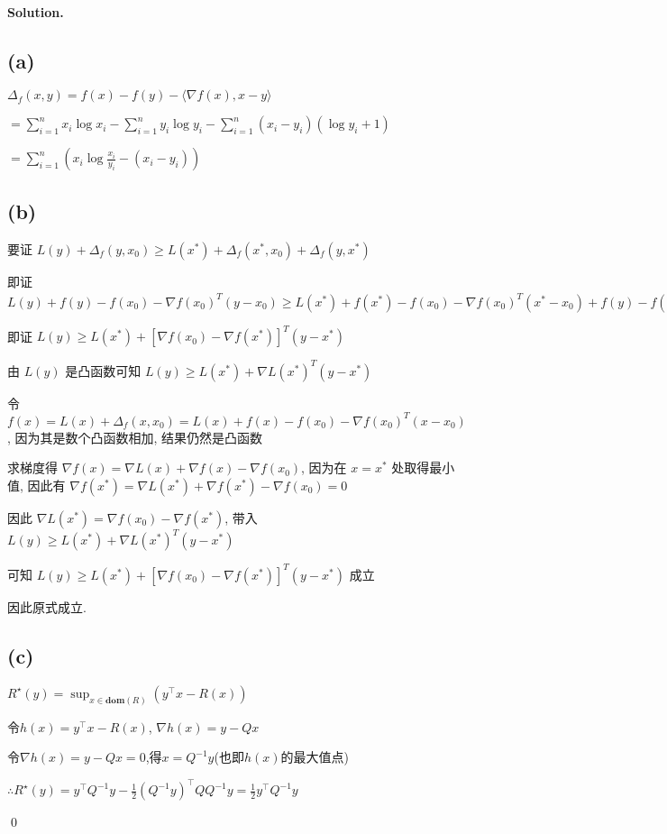\documentclass[a4paper]{article}
\newenvironment{solution}
{\color{blue} \paragraph{Solution.}}
{\newline \qed}
\begin{document}
\begin{solution}
\subsection*{(a)}
$\Delta_{f} (x, y)=f(x)-f(y)- \langle \nabla f(x), x-y\rangle$

$=\sum^n_{i=1} x_i\log x_i -\sum^n_{i=1} y_i\log y_i- \sum^n_{i=1} (x_i-y_i)(\log y_i+1)$

$=\sum^n_{i=1}(x_i\log \frac{x_i}{y_i}-(x_i-y_i))$
\subsection*{(b)}
要证 $\displaystyle L(y)+\Delta_{f}(y,x_0)\geqslant L(x^{*})+\Delta_{f}(x^{*},x_0)+\Delta_{f}(y,x^{*})$

即证 $\displaystyle L(y)+f(y)-f(x_0)-\nabla f(x_0)^{T}(y-x_0)\geqslant L(x^{*})+f(x^{*})-f(x_0)-\nabla f(x_0)^{T}(x^{*}-x_0)+f(y)-f(x^{*})-\nabla f(x^{*})^{T}(y-x^{*})$

即证 $\displaystyle L(y)\geqslant L(x^{*})+[\nabla f(x_0)-\nabla f(x^{*})]^{T}(y-x^{*})$

由 $L(y)$ 是凸函数可知 $L(y)\geqslant L(x^{*})+\nabla L(x^{*})^{T}(y-x^{*})$

令 $f(x)=L(x)+\Delta_{f}(x,x_0)=L(x)+f(x)-f(x_0)-\nabla f(x_0)^{T}(x-x_0)$, 因为其是数个凸函数相加, 结果仍然是凸函数

求梯度得 $\nabla f(x)=\nabla L(x)+\nabla f(x)-\nabla f(x_0)$, 因为在 $x=x^{*}$ 处取得最小值, 因此有 $\nabla f(x^{*})=\nabla L(x^{*})+\nabla f(x^{*})-\nabla f(x_0)=0$

因此 $\nabla L(x^{*})=\nabla f(x_0)-\nabla f(x^{*})$, 带入 $L(y)\geqslant L(x^{*})+\nabla L(x^{*})^{T}(y-x^{*})$

可知 $L(y)\geqslant L(x^{*})+[\nabla f(x_0)-\nabla f(x^{*})]^{T}(y-x^{*})$ 成立

因此原式成立.
\subsection*{(c)}
$R^{\star}(y) = \sup_{x \in \textbf{dom}(R)} \left(y^{\top}x - R(x)\right)$

令$h(x)=y^{\top}x-R(x)$, $\nabla h(x)=y-Qx$

令$\nabla h(x)=y-Qx=0$,得$x=Q^{-1}y$(也即$h(x)$的最大值点)

$\therefore R^{\star}(y) = y^{\top}Q^{-1}y-\frac{1}{2}({Q^{-1}y})^{\top}Q{Q^{-1}y}=\frac{1}{2}y^{\top}Q^{-1}y$


\end{solution}
\end{document}

